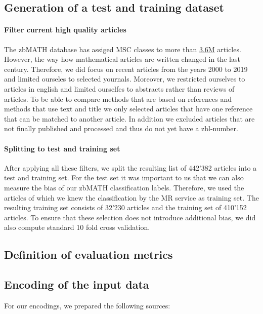 \subsection{Generation of a test and training dataset}
\paragraph{Filter current high quality articles}
The zbMATH database has assiged MSC classes to more than
\href{https://zbmath.org/?q=cc%3A*}%
{3.6M} articles.
However, the way how mathematical articles are written changed in the last century.
Therefore, we did focus on recent articles from the years 2000 to 2019 and limited ourseles to selected yournals.
Moreover, we restricted ourselves to articles in english and limited ourselfes to abstracts rather than reviews of articles.
To be able to compare methods that are based on references and methods that use text and title we only selected articles that have one reference that
can be matched to another article.
In addition we excluded articles that are not finally published and processed and thus do not yet have a zbl-number.
\paragraph{Splitting to test and training set}
After applying all these filters, we split the resulting list of 442'382 articles into a test and training set.
For the test set it was important to us that we can also measure the bias of our zbMATH classification labels.
Therefore, we used the articles of which we knew the classification by the MR service as training set.
The resulting training set consists of 32'230 articles and the training set of 410'152 articles.
To ensure that these selection does not introduce additional bias, we did also compute standard 10 fold cross validation.
\subsection{Definition of evaluation metrics}

\subsection{Encoding of the input data}


For our encodings, we prepared the following sources:

